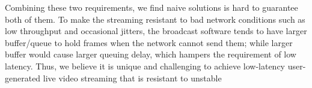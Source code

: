 Combining these two requirements, we find naive solutions is hard to guarantee both of them. To make the streaming resistant to bad network conditions such as low throughput and occasional jitters, the broadcast software tends to have larger buffer/queue to hold frames when the network cannot send them; while larger buffer would cause larger queuing delay, which hampers the requirement of low latency. Thus, we believe it is unique and challenging to achieve low-latency user-generated live video streaming that is resistant to unstable

\fi

\iffalse
\subsection{Commercial Applications}
To validate whether the commercial service provider has solved the issue, we repeat the same black box experiment on two commercial platforms(Twitch, Douyu) and three streamer(OBS, Douyu Tools, XSplit) respectively.
\fi
